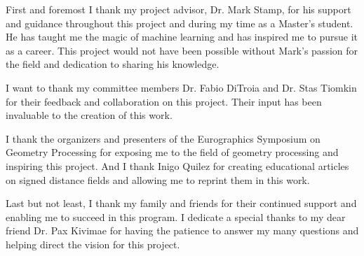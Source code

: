
First and foremost I thank my project advisor, Dr. Mark Stamp, for his support and guidance throughout this project and during my time as a Master's student. He has taught me the magic of machine learning and has inspired me to pursue it as a career. This project would not have been possible without Mark's passion for the field and dedication to sharing his knowledge.

I want to thank my committee members Dr. Fabio DiTroia and Dr. Stas Tiomkin for their feedback and collaboration on this project. Their input has been invaluable to the creation of this work.

I thank the organizers and presenters of the Eurographics Symposium on Geometry Processing for exposing me to the field of geometry processing and inspiring this project. And I thank Inigo Quilez for creating educational articles on signed distance fields and allowing me to reprint them in this work.

Last but not least, I thank my family and friends for their continued support and enabling me to succeed in this program. I dedicate a special thanks to my dear friend Dr. Pax Kivimae for having the patience to answer my many questions and helping direct the vision for this project.